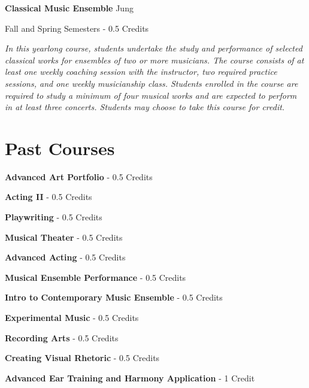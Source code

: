 \noindent\textbf{Classical Music Ensemble} \hfill Jung

\noindent Fall and Spring Semesters - 0.5 Credits

\vspace{1mm}\emph{In this yearlong course, students undertake the study and performance of selected classical works for ensembles of two or more musicians. The course consists of at least one weekly coaching session with the instructor, two required practice sessions, and one weekly musicianship class. Students enrolled in the course are required to study a minimum of four musical works and are expected to perform in at least three concerts. Students may choose to take this course for credit.}\\


\section{Past Courses}

\noindent\textbf{Advanced Art Portfolio}  - 0.5 Credits

\vspace{3mm}
\noindent\textbf{Acting II}  - 0.5 Credits

\vspace{3mm}
\noindent\textbf{Playwriting}  - 0.5 Credits

\vspace{3mm}
\noindent\textbf{Musical Theater}  - 0.5 Credits

\vspace{3mm}
\noindent\textbf{Advanced Acting}  - 0.5 Credits

\vspace{3mm}
\noindent\textbf{Musical Ensemble Performance}  - 0.5 Credits

\vspace{3mm}
\noindent\textbf{Intro to Contemporary Music Ensemble}  - 0.5 Credits

\vspace{3mm}
\noindent\textbf{Experimental Music}  - 0.5 Credits

\vspace{3mm}
\noindent\textbf{Recording Arts}  - 0.5 Credits

\vspace{3mm}
\noindent\textbf{Creating Visual Rhetoric}  - 0.5 Credits

\vspace{3mm}
\noindent\textbf{Advanced Ear Training and Harmony Application}  - 1 Credit

